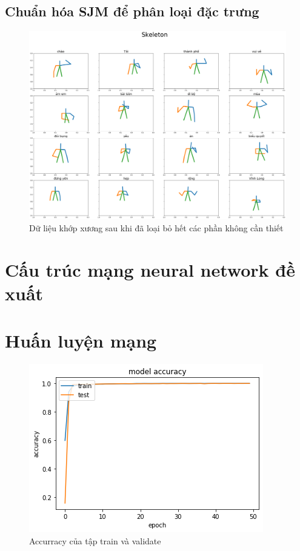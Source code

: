 \subsection{Chuẩn hóa SJM để phân loại đặc trưng}
\FloatBarrier
\begin{figure}[htp]
\begin{center}
\includegraphics[scale=0.25]{chap4/c4_figs/datajoint.png}
\end{center}
\caption{Dữ liệu khớp xương sau khi đã loại bỏ hết các phần không cần thiết}
\label{fig:pipelineS}
\end{figure}
\FloatBarrier

\section{Cấu trúc mạng neural network đề xuất}

\section{Huấn luyện mạng}

\FloatBarrier
\begin{figure}[htp]
\begin{center}
\includegraphics[scale=1]{chap4/c4_figs/train_val_acc.png}
\end{center}
\caption{Accurracy của tập train và validate}
\label{fig:pipelineS}
\end{figure}
\FloatBarrier

